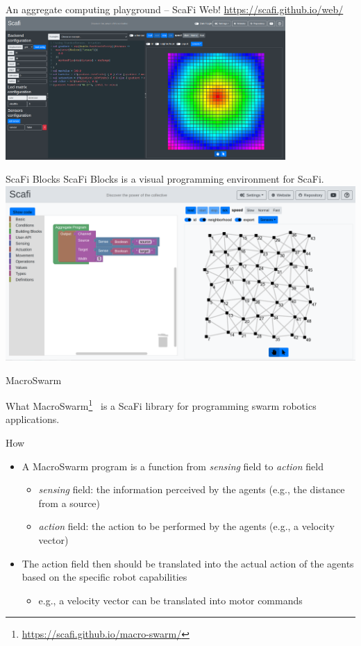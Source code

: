\documentclass[presentation, 9pt]{beamer}\mode<presentation>{\usetheme{AMSBolognaFC}}
\begin{document}
\begin{frame}{An aggregate computing playground -- ScaFi Web!}
\centering
\url{https://scafi.github.io/web/}
\centering
\includegraphics[width=0.8\textwidth]{img/gradient-web.png}
\end{frame}

\begin{frame}{ScaFi Blocks}
ScaFi Blocks is a visual programming environment for ScaFi.
\centering
\includegraphics[width=\textwidth]{img/scafiblocks.png}
\end{frame}
\begin{frame}{MacroSwarm}
	\begin{alertblock}{What}
		MacroSwarm\footnote{\url{https://scafi.github.io/macro-swarm/}}~\cite{macroswarm-arxiv} is a ScaFi library for programming swarm robotics applications.
	\end{alertblock}
	\begin{exampleblock}{How}
		\begin{itemize}
			\item A MacroSwarm program is a function from \emph{sensing} field to \emph{action} field
			\begin{itemize}
				\item \emph{sensing} field: the information perceived by the agents (e.g., the distance from a source)
				\item \emph{action} field: the action to be performed by the agents (e.g., a velocity vector)
			\end{itemize}
			\item The action field then should be translated into the actual action of the agents based on the specific robot capabilities
			\begin{itemize}
				\item e.g., a velocity vector can be translated into motor commands
			\end{itemize}
		\end{itemize}
	\end{exampleblock}
\end{frame}
\end{document}
